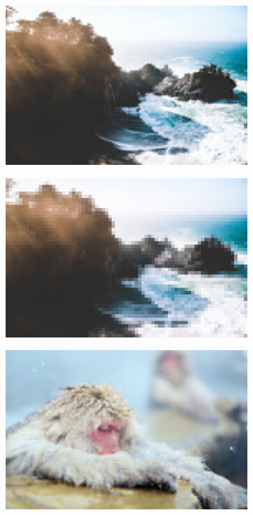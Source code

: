 \documentclass{article}
\begin{document}
\begin{figure}
    \centering
    \begin{subfigure}[b]{0.49 \textwidth}
    \includegraphics[width=\textwidth]{Images/autoencoder/reconstructed/512_256/test1_80.png}
    \end{subfigure}
    \begin{subfigure}[b]{0.49 \textwidth}
    \includegraphics[width=\textwidth]{Images/autoencoder/reconstructed/512_256_128/test1_80.png}
    \end{subfigure}
    \begin{subfigure}[b]{0.49 \textwidth}
    \includegraphics[width=\textwidth]{Images/autoencoder/reconstructed/512_256/test2_80.png}

\end{subfigure}
\end{figure}
\end{document}
